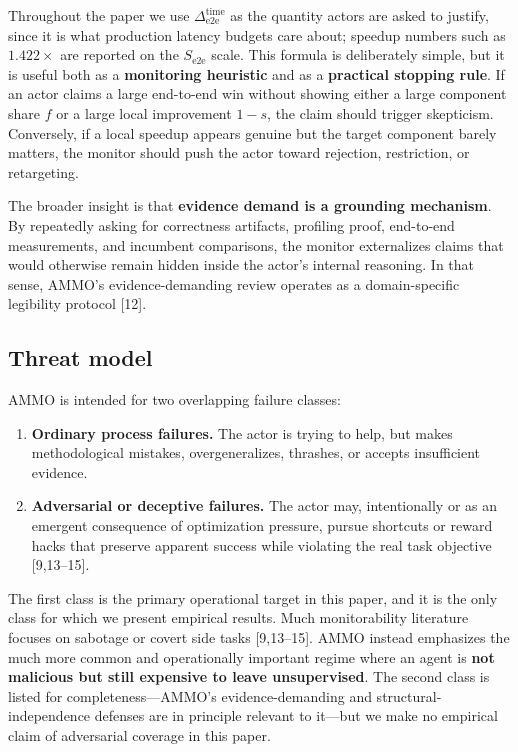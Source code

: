 \documentclass[11pt]{article}
\begin{document}
Throughout the paper we use $\Delta_{\text{e2e}}^{\text{time}}$ as the quantity actors are asked to justify, since it is what production latency budgets care about; speedup numbers such as $1.422\times$ are reported on the $S_{\text{e2e}}$ scale. This formula is deliberately simple, but it is useful both as a \textbf{monitoring heuristic} and as a \textbf{practical stopping rule}. If an actor claims a large end-to-end win without showing either a large component share $f$ or a large local improvement $1-s$, the claim should trigger skepticism. Conversely, if a local speedup appears genuine but the target component barely matters, the monitor should push the actor toward rejection, restriction, or retargeting.

The broader insight is that \textbf{evidence demand is a grounding mechanism}. By repeatedly asking for correctness artifacts, profiling proof, end-to-end measurements, and incumbent comparisons, the monitor externalizes claims that would otherwise remain hidden inside the actor's internal reasoning. In that sense, AMMO's evidence-demanding review operates as a domain-specific legibility protocol [12].

\subsection{Threat model}
\label{sec:threat}

AMMO is intended for two overlapping failure classes:

\begin{enumerate}[leftmargin=*,itemsep=2pt]
  \item \textbf{Ordinary process failures.} The actor is trying to help, but makes methodological mistakes, overgeneralizes, thrashes, or accepts insufficient evidence.
  \item \textbf{Adversarial or deceptive failures.} The actor may, intentionally or as an emergent consequence of optimization pressure, pursue shortcuts or reward hacks that preserve apparent success while violating the real task objective [9,13--15].
\end{enumerate}

The first class is the primary operational target in this paper, and it is the only class for which we present empirical results. Much monitorability literature focuses on sabotage or covert side tasks [9,13--15]. AMMO instead emphasizes the much more common and operationally important regime where an agent is \textbf{not malicious but still expensive to leave unsupervised}. The second class is listed for completeness---AMMO's evidence-demanding and structural-independence defenses are in principle relevant to it---but we make no empirical claim of adversarial coverage in this paper.
\end{document}
